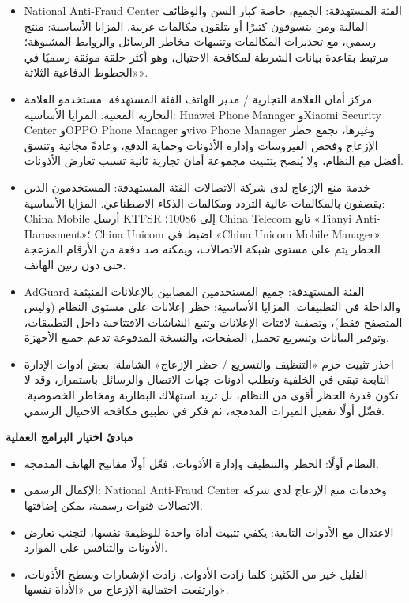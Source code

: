 
\begin{itemize}
  \item National Anti-Fraud Center الفئة المستهدفة: الجميع، خاصة كبار السن والوظائف المالية ومن يتسوقون كثيرًا أو يتلقون مكالمات غريبة. المزايا الأساسية: منتج رسمي، مع تحذيرات المكالمات وتنبيهات مخاطر الرسائل والروابط المشبوهة؛ مرتبط بقاعدة بيانات الشرطة لمكافحة الاحتيال، وهو أكثر حلقة موثقة رسميًا في «الخطوط الدفاعية الثلاثة».
  \item مركز أمان العلامة التجارية / مدير الهاتف الفئة المستهدفة: مستخدمو العلامة التجارية المعنية. المزايا الأساسية: Huawei Phone Manager وXiaomi Security Center وOPPO Phone Manager وvivo Phone Manager وغيرها، تجمع حظر الإزعاج وفحص الفيروسات وإدارة الأذونات وحماية الدفع، وعادةً مجانية وتنسق أفضل مع النظام، ولا يُنصح بتثبيت مجموعة أمان تجارية ثانية تسبب تعارض الأذونات.
  \item خدمة منع الإزعاج لدى شركة الاتصالات الفئة المستهدفة: المستخدمون الذين يقصفون بالمكالمات عالية التردد ومكالمات الذكاء الاصطناعي. المزايا الأساسية: China Mobile أرسل KTFSR إلى 10086؛ China Telecom تابع «Tianyi Anti-Harassment»؛ China Unicom اضبط في «China Unicom Mobile Manager». الحظر يتم على مستوى شبكة الاتصالات، ويمكنه صد دفعة من الأرقام المزعجة حتى دون رنين الهاتف.
  \item AdGuard الفئة المستهدفة: جميع المستخدمين المصابين بالإعلانات المنبثقة والداخلة في التطبيقات. المزايا الأساسية: حظر إعلانات على مستوى النظام (وليس المتصفح فقط)، وتصفية لافتات الإعلانات وتتبع الشاشات الافتتاحية داخل التطبيقات، وتوفير البيانات وتسريع تحميل الصفحات، والنسخة المدفوعة تدعم جميع الأجهزة.
  \item احذر تثبيت حزم «التنظيف والتسريع / حظر الإزعاج» الشاملة: بعض أدوات الإدارة التابعة تبقى في الخلفية وتطلب أذونات جهات الاتصال والرسائل باستمرار، وقد لا تكون قدرة الحظر أقوى من النظام، بل تزيد استهلاك البطارية ومخاطر الخصوصية. فضّل أولًا تفعيل الميزات المدمجة، ثم فكر في تطبيق مكافحة الاحتيال الرسمي.
\end{itemize}

\textbf{مبادئ اختيار البرامج العملية}\par

\begin{itemize}
  \item النظام أولًا: الحظر والتنظيف وإدارة الأذونات، فعّل أولًا مفاتيح الهاتف المدمجة.
  \item الإكمال الرسمي: National Anti-Fraud Center وخدمات منع الإزعاج لدى شركة الاتصالات قنوات رسمية، يمكن إضافتها.
  \item الاعتدال مع الأدوات التابعة: يكفي تثبيت أداة واحدة للوظيفة نفسها، لتجنب تعارض الأذونات والتنافس على الموارد.
  \item القليل خير من الكثير: كلما زادت الأدوات، زادت الإشعارات وسطح الأذونات، وارتفعت احتمالية الإزعاج من «الأداة نفسها».
\end{itemize}

